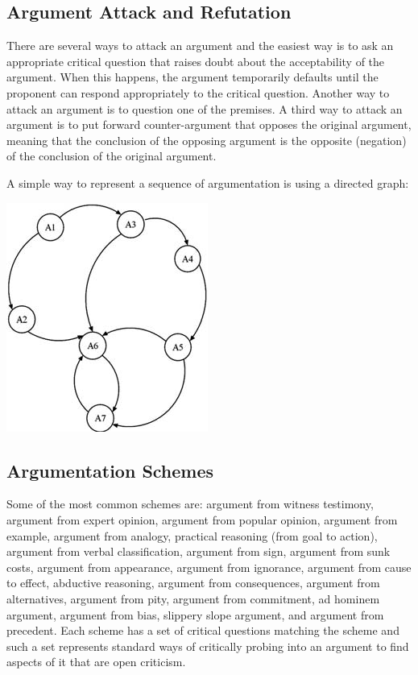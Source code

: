 \documentclass[lnbip]{svmultln}
\begin{document}
\subsection{Argument Attack and Refutation}
\par
There are several ways to attack an argument and the easiest way is to ask an appropriate critical question that raises doubt about the acceptability of the argument. When this happens, the argument temporarily defaults until the proponent can respond appropriately to the critical question. Another way to attack an argument is to question one of the premises. A third way to attack an argument is to put forward counter-argument that opposes the original argument, meaning that the conclusion of the opposing argument is the opposite (negation) of the conclusion of the original argument.
\par
A simple way to represent a sequence of argumentation is using a directed graph:
\begin{center}
\includegraphics{attack.png}
\end{center}
\subsection{Argumentation Schemes}
\par
Some of the most common schemes are: argument from witness testimony, argument from expert opinion, argument from popular opinion, argument from example, argument from analogy, practical reasoning (from goal to action), argument from verbal classification, argument from sign, argument from sunk costs, argument from appearance, argument from ignorance, argument from cause to effect, abductive reasoning, argument from consequences, argument from alternatives, argument from pity, argument from commitment, ad hominem argument, argument from bias, slippery slope argument, and argument from precedent. Each scheme has a set of critical questions matching the scheme and such a set represents standard ways of critically probing into an argument to find aspects of it that are open criticism.
\end{document}

